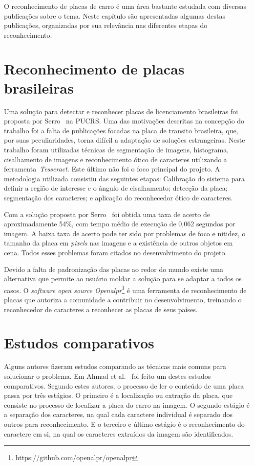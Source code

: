 O reconhecimento de placas de carro é uma área bastante estudada com diversas publicações sobre o tema. Neste capítulo são apresentadas algumas destas publicações, organizadas por sua relevância nas diferentes etapas do reconhecimento.

\section{Reconhecimento de placas brasileiras}

Uma solução para detectar e reconhecer placas de licenciamento brasileiras foi
proposta por Serro~\cite{serro2012deteccao} na PUCRS\@. Uma das motivações descritas na concepção do trabalho foi a falta de publicações focadas na placa de transito brasileira, que, por suas peculiaridades,
torna difícil a adaptação de soluções estrangeiras. Neste trabalho foram
utilizadas técnicas de segmentação de imagens, histograma, cisalhamento de
imagens e reconhecimento ótico de caracteres utilizando a ferramenta~\emph{Tesseract}. Este último não foi o foco principal do projeto. A metodologia utilizada consistiu das
seguintes etapas: Calibração do sistema
para definir a região de interesse e o ângulo de cisalhamento; detecção da
placa; segmentação dos caracteres; e aplicação do reconhecedor ótico de
caracteres.

Com a solução proposta por Serro~\cite{serro2012deteccao}  foi obtida uma taxa de
acerto de aproximadamente 54\%, com tempo médio de execução de 0,062 segundos por imagem.
A baixa taxa de acerto pode ter sido por problemas de foco e nitidez, o tamanho da placa em
\emph{pixels} nas imagens e a existência de outros objetos em cena. Todos esses problemas foram citados no desenvolvimento do projeto.

Devido a falta de padronização das placas ao redor do mundo existe uma alternativa que permite ao usuário moldar a solução para se adaptar a todos os casos.  O \emph{software open source Openalpr}\footnote{https://github.com/openalpr/openalpr}
é uma ferramenta de reconhecimento de placas que autoriza a comunidade a contribuir no desenvolvimento, treinando o reconhecedor de caracteres a reconhecer as placas de seus países. 

\section{Estudos comparativos}
Alguns autores fizeram estudos comparando as técnicas mais comuns para solucionar o problema. Em Ahmad et al.~\cite{ahmad2015automatic} foi feito um  destes estudos comparativos. Segundo estes
autores, o processo de ler o conteúdo de uma placa passa por três estágios. O primeiro é a localização ou extração da placa, que consiste no processo de
localizar a placa do carro na imagem. O segundo estágio é a separação dos
caracteres, na qual cada caractere individual é separado dos outros para
reconhecimento. E o terceiro e último estágio é o reconhecimento do caractere em si, na qual os caracteres extraídos da imagem são identificados.

